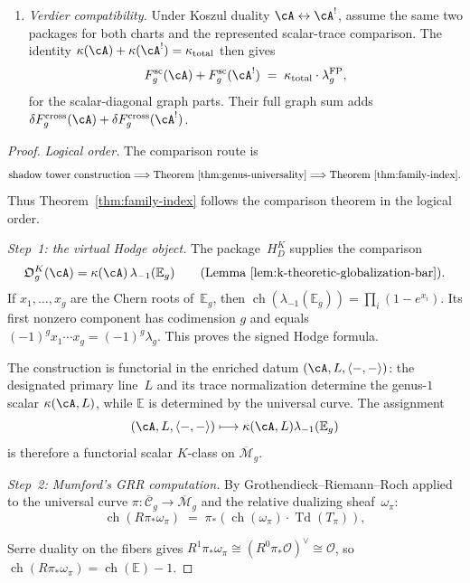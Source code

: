 \begin{theorem}
\begin{enumerate}[label=\textup{(\roman*)}]
\item \emph{Verdier compatibility.}
Under Koszul duality $\cA \leftrightarrow \cA^!$, assume the same
two packages for both charts and the represented scalar-trace
comparison.  The identity
$\kappa(\cA) + \kappa(\cA^!) = \kappa_{\mathrm{total}}$
then gives
\[
F_g^{\mathrm{sc}}(\cA) + F_g^{\mathrm{sc}}(\cA^!)
\;=\;
\kappa_{\mathrm{total}} \cdot \lambda_g^{\mathrm{FP}},
\]
for the scalar-diagonal graph parts.  Their full graph sum adds
$\delta F_g^{\mathrm{cross}}(\cA)
+\delta F_g^{\mathrm{cross}}(\cA^!)$.
\end{enumerate}
\end{theorem}

\begin{proof}
\emph{Logical order.}
The comparison route is
\[
\text{shadow tower construction}
\Longrightarrow
\text{Theorem~\ref{thm:genus-universality}}
\Longrightarrow
\text{Theorem~\ref{thm:family-index}}.
\]
Thus Theorem~\ref{thm:family-index} follows the comparison theorem in
the logical order.

\emph{Step~1: the virtual Hodge object.}
The package~$H_D^K$ supplies the comparison
\[
\mathfrak O_g^K(\cA)
= \kappa(\cA)\,\lambda_{-1}(\mathbb{E}_g)
\qquad
\textup{(Lemma~\ref{lem:k-theoretic-globalization-bar})}.
\]
If $x_1,\ldots,x_g$ are the Chern roots of~$\mathbb E_g$, then
$\operatorname{ch}(\lambda_{-1}(\mathbb E_g))
=\prod_i(1-e^{x_i})$.  Its first nonzero component has codimension
$g$ and equals $(-1)^g x_1\cdots x_g=(-1)^g\lambda_g$.  This proves
the signed Hodge formula.

The construction is functorial in the enriched datum
$(\cA,L,\langle-,-\rangle)$: the designated primary line~$L$ and its
trace normalization determine the genus-$1$ scalar
$\kappa(\cA,L)$, while $\mathbb E$ is determined by the universal
curve.  The assignment
\[
 (\cA,L,\langle-,-\rangle)
 \longmapsto
 \kappa(\cA,L)\lambda_{-1}(\mathbb E_g)
\]
is therefore a functorial scalar $K$-class on
$\overline{\mathcal M}_g$.

\emph{Step~2: Mumford's GRR computation.}
By Grothendieck--Riemann--Roch applied to the universal curve
$\pi \colon \overline{\mathcal{C}}_g \to \overline{\mathcal{M}}_g$
and the relative dualizing sheaf~$\omega_\pi$:
\begin{equation}\label{eq:mumford-grr}
\operatorname{ch}(R\pi_*\omega_\pi)
\;=\;
\pi_*\!\left(
 \operatorname{ch}(\omega_\pi) \cdot
 \operatorname{Td}(T_\pi)
\right),
\end{equation}

Serre duality on the fibers gives
$R^1\pi_*\omega_\pi \cong (R^0\pi_*\mathcal{O})^\vee \cong \mathcal{O}$,
so $\operatorname{ch}(R\pi_*\omega_\pi) = \operatorname{ch}(\mathbb{E}) - 1$.


\end{proof}
